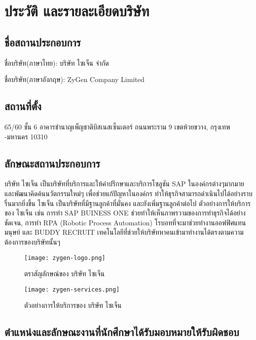 \section{ประวัติ และรายละเอียดบริษัท}

\subsection{ชื่อสถานประกอบการ}

ชื่อบริษัท(ภาษาไทย): บริษัท ไซเจ็น จำกัด

ชื่อบริษัท(ภาษาอังกฤษ): ZyGen Company Limited

\subsection{สถานที่ตั้ง}

65/60 ชั้น 6 อาคารชำนาญเพ็ญชาติบิสเนสเซ็นเตอร์ ถนนพระราม 9 เขตห้วยขวาง, กรุงเทพ -มหานคร 10310

\subsection{ลักษณะสถานประกอบการ}

บริษัท ไซเจ็น เป็นบริษัทที่บริการและให้คำปรึกษาและบริการโซลูชัน SAP ในองค์กรต่างๆมากมาย และพัฒนาคิดค้นนวัตกรรมใหม่ๆ เพื่อช่วยแก้ปัญหาในองค์กร ทำให้ธุรกิจสามารถดำเนินไปได้อย่างราบรื่นมากยิ่งขึ้น ไซเจ็น เป็นบริษัทที่มีฐานลูกค้าที่มั่นคง และยังเพิ่มฐานลูกค้าต่อไป ตัวอย่างการให้บริการของ ไซเจ็น เช่น การทำ SAP BUINESS ONE ช่วยทำให้เห็นภาพรวามของการทำธุรกิจได้อย่างชัดเจน,  การทำ RPA (Robotic Process Automation) โรบอทที่จะมาช่วยทำงานออฟฟิศแทนมนุษย์ และ BUDDY RECRUIT เทคโนโลยีที่ช่วยให้บริษัทหาคนเข้ามาทำงานได้ตรงตามความต้องการของบริษัทนั้นๆ

\begin{figure}[H]
  \centering
  \texttt{[image: zygen-logo.png]}
  \caption{ตราสัญลักษณ์ของ บริษัท ไซเจ็น}
  \label{Fig:zygen-logo}
\end{figure}

\begin{figure}[H]
  \centering
  \texttt{[image: zygen-services.png]}
  \caption{ตัวอย่างการให้บริการของ บริษัท ไซเจ็น}
  \label{Fig:zygen-services}
\end{figure}

\subsection{ตำแหน่งและลักษณะงานที่นักศึกษาได้รับมอบหมายให้รับผิดชอบ}

